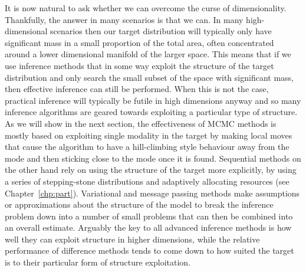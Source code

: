 It is now natural to ask whether we can overcome the curse of dimensionality.  Thankfully, the
answer in many scenarios is that we can.  In many high-dimensional scenarios then our target
distribution will typically only have significant mass in a small proportion of the total area, often
concentrated around a lower dimensional manifold of the larger space.  This means that if
we use inference methods that in some way exploit the structure of the target distribution and only
search the small subset of the space with significant mass, then effective inference can still be
performed.  When this is not the case, practical inference will typically be futile in high dimensions anyway
and so many inference algorithms are geared towards exploiting a particular type of structure.
As we will show in the next section, the effectiveness of MCMC methods is mostly based on 
exploiting single modality in the target by making local moves that cause the algorithm to have a
hill-climbing style behaviour away from the mode and then sticking close to the mode once it
is found.  Sequential \mc methods on the other hand rely on using the structure of the target
more explicitly, by using a series of stepping-stone distributions and adaptively allocating
resources (see Chapter~\ref{chp:part}).  Variational and message passing methods make assumptions
or approximations about the structure of the model to break the inference problem down
into a number of small problems that can then be combined into an overall estimate.
Arguably the key to all advanced inference methods is how well they can exploit structure
in higher dimensions, while the relative performance of difference methods tends to come down
to how suited the target is to their particular form of structure exploitation.